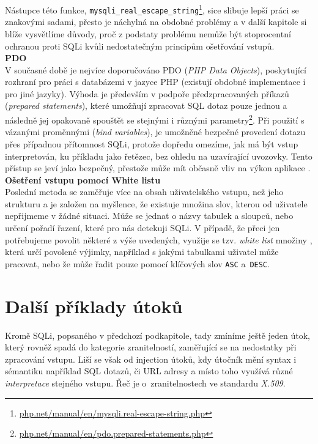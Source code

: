 Nástupce této funkce, \texttt{mysqli\_real\_escape\_string}\footnote{\url{php.net/manual/en/mysqli.real-escape-string.php}}, sice slibuje lepší práci se znakovými sadami, 
přesto je náchylná na obdobné problémy a v další kapitole si blíže vysvětlíme důvody, proč z podstaty problému nemůže být stoprocentní ochranou proti SQLi kvůli 
nedostatečným principům ošetřování vstupů. \\

\Bat{} \textbf{PDO}\\
V současné době je nejvíce doporučováno PDO (\textit{PHP Data Objects}), poskytující rozhraní pro práci s databázemi v jazyce PHP (existují obdobné
implementace i pro jiné jazyky). Výhoda je především v podpoře předzpracovaných příkazů (\textit{prepared statements}), které umožňují zpracovat SQL dotaz 
pouze jednou a následně jej opakovaně spouštět se stejnými i různými parametry\footnote{\url{php.net/manual/en/pdo.prepared-statements.php}}. 
Při použití s vázanými proměnnými (\textit{bind variables}), je umožněné bezpečné provedení dotazu přes případnou přítomnost SQLi, protože dopředu
omezíme, jak má být vstup interpretován, ku příkladu jako řetězec, bez ohledu na uzavírající uvozovky. Tento přístup se jeví jako bezpečný,
přestože může mít občasně vliv na výkon aplikace \cite{OWASP2018}.\\

\Bat{} \textbf{Ošetření vstupu pomocí White listu}\\
Poslední metoda se zaměřuje více na obsah uživatelského vstupu, než jeho strukturu a je založen na myšlence, že existuje množina slov, kterou
od uživatele nepřijmeme v žádné situaci. Může se jednat o názvy tabulek a sloupců, nebo určení pořadí řazení, které pro nás detekuji SQLi. 
V případě, že přeci jen potřebujeme povolit některé z výše uvedených, využije se tzv. \textit{white list} množiny \cite{OWASP2018}, která určí povolené výjimky, 
například s jakými tabulkami uživatel může pracovat, nebo že může řadit pouze pomocí klíčových slov \texttt{ASC} a~\texttt{DESC}.

\section{Další příklady útoků} \label{sec:3:attacks}
Kromě SQLi, popsaného v předchozí podkapitole, tady zmíníme ještě jeden útok, který rovněž spadá do kategorie zranitelností, zaměřující se
na nedostatky při zpracování vstupu. Liší se však od injection útoků, kdy útočník mění syntax i sémantiku například SQL dotazů, či URL
adresy a místo toho využívá různé \textit{interpretace} stejného vstupu. Řeč je o~zranitelnostech ve standardu \textit{X.509}.

